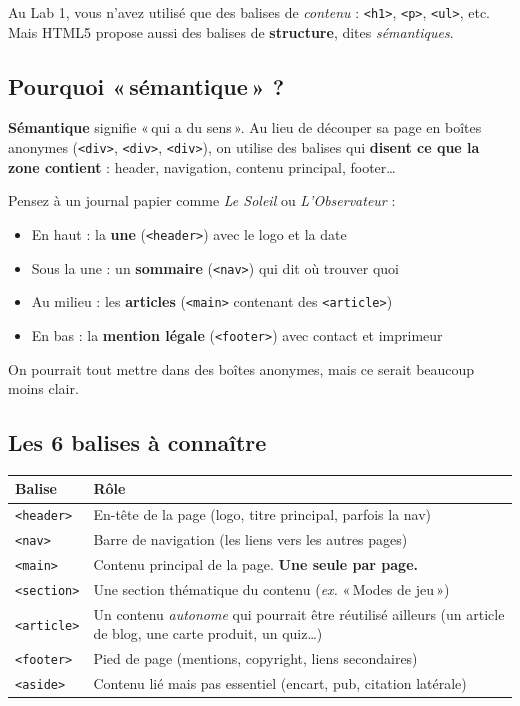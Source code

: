 \documentclass[11pt,a4paper]{article}
\begin{document}
Au Lab 1, vous n'avez utilisé que des balises de \emph{contenu} :
\texttt{<h1>}, \texttt{<p>}, \texttt{<ul>}, etc. Mais HTML5 propose aussi
des balises de \textbf{structure}, dites \emph{sémantiques}.

\subsection{Pourquoi «\,sémantique\,» ?}

\textbf{Sémantique} signifie «\,qui a du sens\,». Au lieu de découper sa
page en boîtes anonymes (\texttt{<div>}, \texttt{<div>}, \texttt{<div>}),
on utilise des balises qui \textbf{disent ce que la zone contient} :
header, navigation, contenu principal, footer\ldots

\begin{infobox}
Pensez à un journal papier comme \emph{Le Soleil} ou \emph{L'Observateur} :
\begin{itemize}[nosep]
    \item En haut : la \textbf{une} (\texttt{<header>}) avec le logo et la date
    \item Sous la une : un \textbf{sommaire} (\texttt{<nav>}) qui dit où trouver quoi
    \item Au milieu : les \textbf{articles} (\texttt{<main>} contenant des \texttt{<article>})
    \item En bas : la \textbf{mention légale} (\texttt{<footer>}) avec contact et imprimeur
\end{itemize}
On pourrait tout mettre dans des boîtes anonymes, mais ce serait beaucoup
moins clair.
\end{infobox}

\subsection{Les 6 balises à connaître}

\begin{center}
\begin{tabular}{@{}lp{8cm}@{}}
\toprule
\textbf{Balise} & \textbf{Rôle} \\
\midrule
\texttt{<header>} & En-tête de la page (logo, titre principal, parfois la nav) \\
\addlinespace
\texttt{<nav>}    & Barre de navigation (les liens vers les autres pages) \\
\addlinespace
\texttt{<main>}   & Contenu principal de la page. \textbf{Une seule par page.} \\
\addlinespace
\texttt{<section>} & Une section thématique du contenu (\emph{ex.} «\,Modes de jeu\,») \\
\addlinespace
\texttt{<article>} & Un contenu \emph{autonome} qui pourrait être réutilisé ailleurs (un article de blog, une carte produit, un quiz\ldots) \\
\addlinespace
\texttt{<footer>}  & Pied de page (mentions, copyright, liens secondaires) \\
\addlinespace
\texttt{<aside>}   & Contenu lié mais pas essentiel (encart, pub, citation latérale) \\
\bottomrule
\end{tabular}
\end{center}
\end{document}
